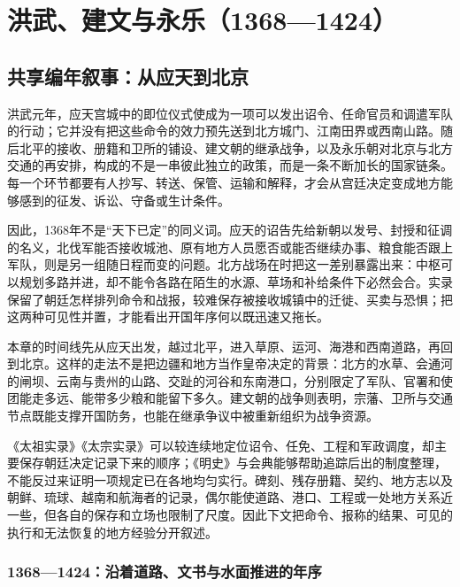 \chapter{洪武、建文与永乐（1368—1424）}
\label{ch:hongwu-jianwen-yongle}

\section{共享编年叙事：从应天到北京}

洪武元年，应天宫城中的即位仪式使成为一项可以发出诏令、任命官员和调遣军队的行动；它并没有把这些命令的效力预先送到北方城门、江南田界或西南山路。随后北平的接收、册籍和卫所的铺设、建文朝的继承战争，以及永乐朝对北京与北方交通的再安排，构成的不是一串彼此独立的政策，而是一条不断加长的国家链条。每一个环节都要有人抄写、转送、保管、运输和解释，才会从宫廷决定变成地方能够感到的征发、诉讼、守备或生计条件。

因此，1368年不是“天下已定”的同义词。应天的诏告先给新朝以发号、封授和征调的名义，北伐军能否接收城池、原有地方人员愿否或能否继续办事、粮食能否跟上军队，则是另一组随日程而变的问题。北方战场在时把这一差别暴露出来：中枢可以规划多路并进，却不能令各路在陌生的水源、草场和补给条件下必然会合。实录保留了朝廷怎样排列命令和战报，较难保存被接收城镇中的迁徙、买卖与恐惧；把这两种可见性并置，才能看出开国年序何以既迅速又拖长。

本章的时间线先从应天出发，越过北平，进入草原、运河、海港和西南道路，再回到北京。这样的走法不是把边疆和地方当作皇帝决定的背景：北方的水草、会通河的闸坝、云南与贵州的山路、交趾的河谷和东南港口，分别限定了军队、官署和使团能走多远、能带多少粮和能留下多久。建文朝的战争则表明，宗藩、卫所与交通节点既能支撑开国防务，也能在继承争议中被重新组织为战争资源。

\begin{sourcenote}[哪些材料能看见这条链]
《太祖实录》《太宗实录》可以较连续地定位诏令、任免、工程和军政调度，却主要保存朝廷决定记录下来的顺序；《明史》与会典能够帮助追踪后出的制度整理，不能反过来证明一项规定已在各地均匀实行。碑刻、残存册籍、契约、地方志以及朝鲜、琉球、越南和航海者的记录，偶尔能使道路、港口、工程或一处地方关系近一些，但各自的保存和立场也限制了尺度。因此下文把命令、报称的结果、可见的执行和无法恢复的地方经验分开叙述。
\end{sourcenote}

\subsection{1368—1424：沿着道路、文书与水面推进的年序}

